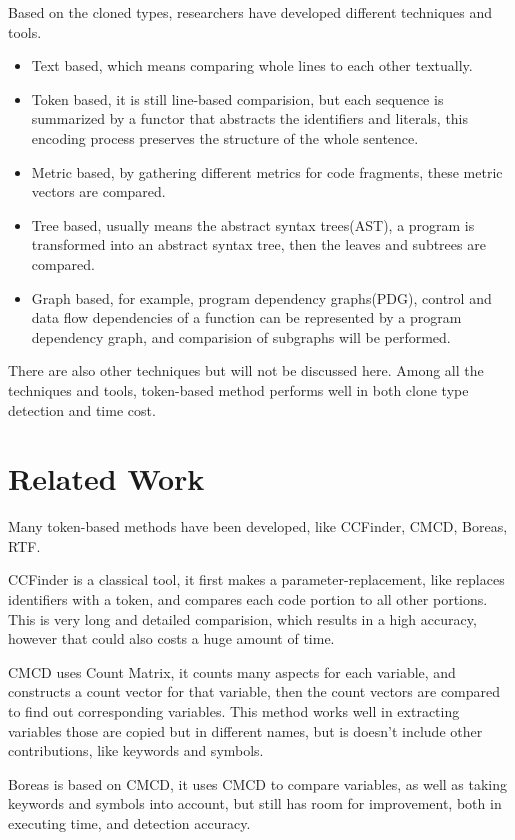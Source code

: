 \documentclass[conference]{IEEEtran}
\begin{document}
Based on the cloned types, researchers have developed different techniques and tools. 
\begin{itemize}
\item Text based, which means comparing whole lines to each other textually. 
\item Token based, it is still line-based comparision, but each sequence is summarized by a functor that abstracts the identifiers and literals, this encoding process preserves the structure of the whole sentence.
\item Metric based, by gathering different metrics for code fragments, these metric vectors are compared.
\item Tree based, usually means the abstract syntax trees(AST), a program is transformed into an abstract syntax tree, then the leaves and subtrees are compared.
\item Graph based, for example, program dependency graphs(PDG), control and data flow dependencies of a function can be represented by a program dependency graph, and comparision of subgraphs will be performed.
\end{itemize}

There are also other techniques but will not be discussed here.
Among all the techniques and tools, token-based method performs well in both clone type detection and time cost.


\section{Related Work}

Many token-based methods have been developed, like CCFinder\cite{CCFinder}, CMCD\cite{CMCD},  Boreas\cite{Boreas}, RTF\cite{RTF}. 

CCFinder is a classical tool, it first makes a parameter-replacement, like replaces identifiers with a token, and compares each code portion to all other portions. This is very long and detailed comparision, which results in a high accuracy, however that could also costs a huge amount of time.

CMCD uses Count Matrix, it counts many aspects for each variable, and constructs a count vector for that variable, then the count vectors are compared to find out corresponding variables. This method works well in extracting variables those are copied but in different names, but is doesn't include other contributions, like keywords and symbols.

Boreas is based on CMCD, it uses CMCD to compare variables, as well as taking keywords and symbols into account, but still has room for improvement, both in executing time, and detection accuracy. 
\end{document}
